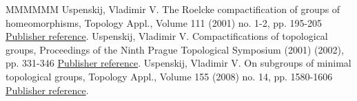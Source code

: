 \documentclass[11pt]{article}
\theoremstyle{definition}
\numberwithin{equation}{section}
\numberwithin{figure}{section}
\numberwithin{table}{section}
\begin{document}
\begin{thebibliography}{MMMMMM}
 Uspenskij, Vladimir V. The Roelcke compactification of groups of homeomorphisms, Topology Appl., Volume 111 (2001) no. 1-2, pp. 195-205 \href{https://ahl.centre-mersenne.org/item/AHL_2019__2__149_0/#Us3}{Publisher reference}.
 Uspenskij, Vladimir V. Compactifications of topological groups, Proceedings of the Ninth Prague Topological Symposium (2001) (2002), pp. 331-346 \href{https://ahl.centre-mersenne.org/item/AHL_2019__2__149_0/#Us4}{Publisher reference}.
 Uspenskij, Vladimir V. On subgroups of minimal topological groups, Topology Appl., Volume 155 (2008) no. 14, pp. 1580-1606 \href{https://ahl.centre-mersenne.org/item/AHL_2019__2__149_0/#Us5}{Publisher reference}.
\end{thebibliography}
\end{document}
